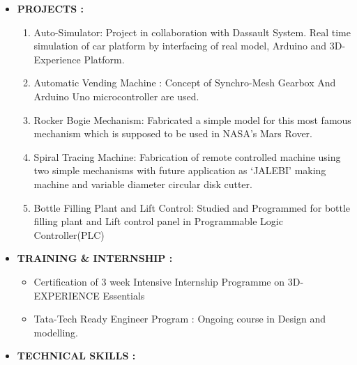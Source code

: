 \documentclass[11pt]{article}
\begin{document}
\begin{itemize}[label=$\star$]
\begin{flushleft}
\begin{tabular}{|c|c|c|c|c|}
			\end{tabular}
		\end{flushleft}
		\bigskip
		\item	\begin{large} \textbf{PROJECTS :} \end{large}
		\begin{enumerate}
			\itemsep0em
			\item Auto-Simulator: Project in collaboration with Dassault System. Real time simulation of car platform by interfacing of real model, Arduino and 3D-Experience Platform. 
			\item Automatic Vending Machine : Concept of Synchro-Mesh Gearbox And Arduino Uno microcontroller are used.
			\item Rocker Bogie Mechanism: Fabricated a simple model for this most famous mechanism which is supposed to be used in NASA's Mars Rover.
			\item Spiral Tracing Machine: Fabrication of remote controlled machine using two simple mechanisms with future application as `JALEBI' making machine and variable diameter circular disk cutter.
			\item Bottle Filling Plant and Lift Control: Studied and Programmed for bottle filling plant and Lift control panel in Programmable Logic Controller(PLC)
		\end{enumerate}
		\newpage
		\item	\begin{large} \textbf{TRAINING \& INTERNSHIP :} \end{large}
		\begin{itemize}[label=$\bullet$]
			\itemsep0em
			\item Certification of 3 week Intensive Internship Programme on 3D-EXPERIENCE Essentials 
			\item Tata-Tech Ready Engineer Program : Ongoing course in Design and modelling.
		\end{itemize}
		\bigskip
		\item	\begin{large} \textbf{TECHNICAL SKILLS :} \end{large}

\end{itemize}
\end{document}

